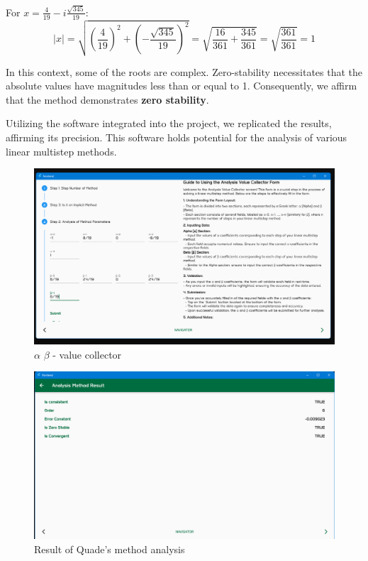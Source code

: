 For \( x = \frac{4}{19} - i\frac{\sqrt{345}}{19} \):
\[
|x| = \sqrt{\left(\frac{4}{19}\right)^2 + \left(-\frac{\sqrt{345}}{19}\right)^2} = \sqrt{\frac{16}{361} + \frac{345}{361}} = \sqrt{\frac{361}{361}} = 1
\]

In this context, some of the roots are complex. Zero-stability necessitates that the absolute values have magnitudes less than or equal to 1. Consequently, we affirm that the method demonstrates \textbf{zero stability}.

Utilizing the software integrated into the project, we replicated the results, affirming its precision. This software holds potential for the analysis of various linear multistep methods.

\begin{figure}[htbp]
    \centering
    \includegraphics[width=1\textwidth]{chapters/4/image/1.png}
    \caption{$\alpha$ $\beta$ - value collector}
\end{figure}

\begin{figure}[htbp]
    \centering
    \includegraphics[width=1\textwidth]{chapters/4/image/2.png}
    \caption{Result of Quade's method analysis}
\end{figure}



